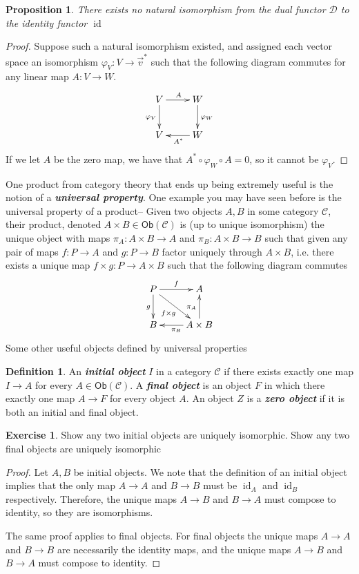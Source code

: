 \documentclass[psamsfonts]{amsart}
\newtheorem{prop}[thm]{Proposition}
\theoremstyle{definition}
\newtheorem{defn}[thm]{Definition}
\newtheorem{exer}[thm]{Exercise}
\theoremstyle{remark}
\newcommand{\ib}[1]{\textbf{\textit{#1}}}
\newcommand{\V}{\vec{v}}
\DeclareMathOperator{\id}{id}
\begin{document}
%
\begin{prop}
There exists no natural isomorphism from the dual functor $\mathcal{D}$ to the identity functor $\id$
\end{prop}
%
\begin{proof}
%
Suppose such a natural isomorphism existed, and assigned each vector space an isomorphism $\varphi_V: V \to \V^*$ such that the following diagram commutes for any linear map $A: V \to W$.
$$\xymatrix{
V \ar[d]_{\varphi_V}\ar[r]^A & W \ar[d]^{\varphi_W} \\
V & W \ar[l]^{A^*}
} $$
If we let $A$ be the zero map, we have that $A^* \circ \varphi_W \circ A = 0$, so it cannot be $\varphi_V$.
\end{proof}
%
One product from category theory that ends up being extremely useful is the notion of a \ib{universal property}. One example you may have seen before is the universal property of a product-- Given two objects $A,B$ in some category $\mathscr{C}$, their product, denoted $A \times B \in \mathsf{Ob}(\mathscr{C})$ is (up to unique isomorphism) the unique object with maps $\pi_A: A\times B \to A$ and $\pi_B : A \times B \to B$ such that given any pair of maps $f: P \to A$ and $g: P \to B$ factor uniquely through $A \times B$, i.e. there exists a unique map $f \times g: P \to A\times B$ such that the following diagram commutes
$$\xymatrix{
P \ar[dr]_{f \times g} \ar[d]_g \ar[r]^f & A \\
B & A \times B \ar[l]^{\pi_B} \ar[u]^{\pi_A}
}$$
Some other useful objects defined by universal properties
%
\begin{defn}
An \ib{initial object}  $I$ in a category $\mathscr{C}$ if there exists exactly one map $I \to A$ for every $A \in \mathsf{Ob}(\mathscr{C})$. A \ib{final object} is an object $F$ in which there exactly one map $A \to F$ for every object $A$. An object $Z$ is a \ib{zero object} if it is both an initial and final object.
\end{defn}
%
\begin{exer}
Show any two initial objects are uniquely isomorphic. Show any two final objects are uniquely isomorphic
\end{exer}
%
\begin{proof}
Let $A,B$ be initial objects. We note that the definition of an initial object implies that the only map $A \to A$ and $B \to B$ must be $\id_A$ and $\id_B$ respectively. Therefore, the unique maps $A \to B$ and $B \to A$ must compose to identity, so they are isomorphisms.

The same proof applies to final objects. For final objects the unique maps $A \to A$ and $B \to B$ are necessarily the identity maps, and the unique maps $A \to B$ and $B \to A$ must compose to identity.
\end{proof}
\end{document}
